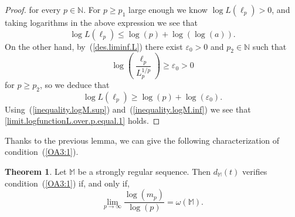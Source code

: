 \documentclass[11pt,a4paper]{article}
\theoremstyle{definition}
\newtheorem{theo}{Theorem}[section]
\def\oo{\infty}
\def\ri{\rightarrow}
\def\ep{\varepsilon}
\def\o{\omega}
\def\N{\mathbb{N}}
\def\M{\mathbb{M}}
\begin{document}
\begin{proof}
 for every $p\in\N$. For $p\geq p_1$ large enough we know $\log L(\ell_p)>0$, and taking logarithms in the above expression we see that
 \begin{equation}\label{inequality.logM.sup}
\log L(\ell_p) \leq \log (p) + \log(\log(a)).
 \end{equation}
On the other hand, by~(\ref{des.liminf.L}) there exist $\ep_0>0$ and $p_2\in \N$ such that
 $$\log \left(\frac{\ell_p}{L^{1/p}_p}\right) \geq \ep_0 >0$$
 for $p\geq p_2$, so we deduce that
 \begin{equation}\label{inequality.logM.inf}
  \log L(\ell_p) \geq \log (p) + \log(\ep_0).
 \end{equation}
Using~(\ref{inequality.logM.sup}) and~(\ref{inequality.logM.inf}) we see that \eqref{limit.logfunctionL.over.p.equal.1} holds.

 \end{proof}

Thanks to the previous lemma, we can give the following characterization of condition~(\ref{OA3:1}).

\begin{theo}\label{teorcondicion3caracterizacion}
Let $\M$ be a strongly regular sequence. Then
$d_{\M}(t)$ verifies condition~(\ref{OA3:1}) if, and only if,
\begin{equation}\label{limit.logmp.over.logp.omega}
    \lim_{p\ri \oo} \frac{\log (m_p)}{\log(p)}=\o(\M).
\end{equation}
\end{theo}
\end{document}
